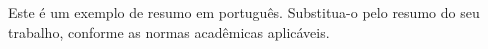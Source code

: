 \begingroup
{}
\renewcommand{\nomepalavraschave}{Palavras-chave}
\begin{resumoutfpr}
Este é um exemplo de resumo em português. Substitua-o pelo resumo do seu trabalho, conforme as normas acadêmicas aplicáveis.
\end{resumoutfpr}
\endgroup
